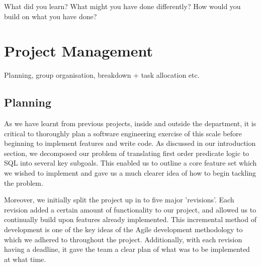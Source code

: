 \documentclass[a4wide, 11pt]{article} \usepackage{a4, fullpage}
\begin{document}
        What did you learn? What might you have done differently?
        How would you build on what you have done? 

\section{Project Management}

        Planning, group organisation, breakdown + task allocation etc.

\subsection{Planning}


As we have learnt from previous projects, inside and outside the department, it
is critical to thoroughly plan a software engineering exercise of this scale
before beginning to implement features and write code. As discussed in our
introduction section, we decomposed our problem of translating first order
predicate logic to SQL into several key subgoals. This enabled us to outline a
core feature set which we wished to implement and gave us a much clearer idea
of how to begin tackling the problem.

Moreover, we initially split the project up in to five major 'revisions'. Each
revision added a certain amount of functionality to our project, and allowed us
to continually build upon features already implemented. This incremental method
of development is one of the key ideas of the Agile development methodology to
which we adhered to throughout the project.  Additionally,
with each revision having a deadline, it gave the team a clear plan of what was
to be implemented at what time.
\end{document}
